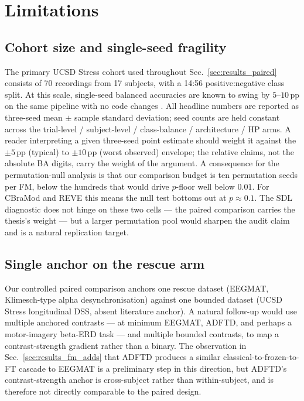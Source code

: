 \section{Limitations}
\label{sec:limitations}

\subsection{Cohort size and single-seed fragility}
The primary UCSD Stress cohort used throughout
Sec.~\ref{sec:results_paired} consists of 70
recordings from 17 subjects, with a 14:56 positive:negative class
split. At this scale, single-seed balanced accuracies are known to
swing by $5$--$10$\,pp on the same pipeline with no code changes
\citep{smalln2025biorxiv}. All headline numbers are reported as
three-seed mean $\pm$ sample standard deviation; seed counts are
held constant across the trial-level / subject-level / class-balance
/ architecture / HP arms. A reader interpreting a given three-seed
point estimate should weight it against the $\pm 5$\,pp (typical) to
$\pm 10$\,pp (worst observed) envelope; the relative claims, not the
absolute BA digits, carry the weight of the argument. A consequence
for the permutation-null analysis is that our comparison budget is
ten permutation seeds per FM, below the hundreds that would drive
$p$-floor well below $0.01$. For CBraMod and REVE this means the
null test bottoms out at $p \approx 0.1$. The SDL diagnostic does not
hinge on these two cells --- the paired comparison carries the
thesis's weight --- but a larger permutation pool would sharpen the
audit claim and is a natural replication target.

\subsection{Single anchor on the rescue arm}
Our controlled paired comparison anchors one rescue dataset (EEGMAT,
Klimesch-type alpha desynchronisation) against one bounded dataset
(UCSD Stress longitudinal DSS, absent literature anchor). A natural
follow-up would use multiple anchored contrasts --- at minimum
EEGMAT, ADFTD, and perhaps a motor-imagery beta-ERD task --- and
multiple bounded contrasts, to map a contrast-strength gradient
rather than a binary. The observation in
Sec.~\ref{sec:results_fm_adds} that ADFTD produces a similar
classical-to-frozen-to-FT cascade to EEGMAT is a preliminary step in
this direction, but ADFTD's contrast-strength anchor is cross-subject
rather than within-subject, and is therefore not directly comparable
to the paired design.

